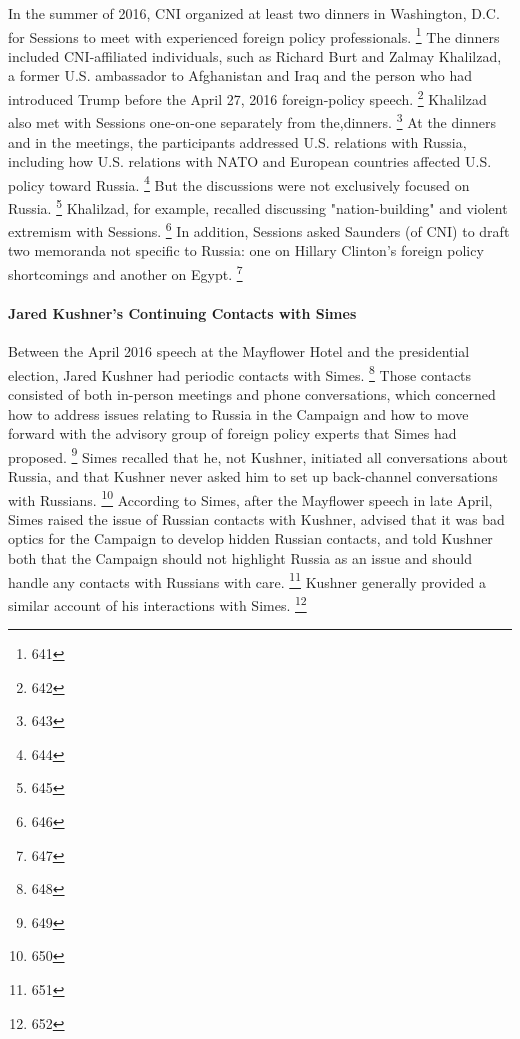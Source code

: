 In the summer of 2016, CNI organized at least two dinners in Washington, D.C. for Sessions to meet with experienced foreign policy professionals.%
\footnote{641}
The dinners included CNI-affiliated individuals, such as Richard Burt and Zalmay Khalilzad, a former U.S. ambassador to Afghanistan and Iraq and the person who had introduced Trump before the April 27, 2016 foreign-policy speech.%
\footnote{642}
Khalilzad also met with Sessions one-on-one separately from the,dinners.%
\footnote{643}
At the dinners and in the meetings, the participants addressed U.S. relations with Russia, including how U.S. relations with NATO and European countries affected U.S. policy toward Russia.%
\footnote{644}
But the discussions were not exclusively focused on Russia.%
\footnote{645}
Khalilzad, for example, recalled discussing "nation-building" and violent extremism with Sessions.%
\footnote{646}
In addition, Sessions asked Saunders (of CNI) to draft two memoranda not specific to Russia: one on Hillary Clinton's foreign policy shortcomings and another on Egypt.%
\footnote{647}

\paragraph{Jared Kushner's Continuing Contacts with Simes}

Between the April 2016 speech at the Mayflower Hotel and the presidential election, Jared Kushner had periodic contacts with Simes.%
\footnote{648}
Those contacts consisted of both in-person meetings and phone conversations, which concerned how to address issues relating to Russia in the Campaign and how to move forward with the advisory group of foreign policy experts that Simes had proposed.%
\footnote{649}
Simes recalled that he, not Kushner, initiated all conversations about Russia, and that Kushner never asked him to set up back-channel conversations with Russians.%
\footnote{650}
According to Simes, after the Mayflower speech in late April, Simes raised the issue of Russian contacts with Kushner, advised that it was bad optics for the Campaign to develop hidden Russian contacts, and told Kushner both that the Campaign should not highlight Russia as an issue and should handle any contacts with Russians with care.%
\footnote{651}
Kushner generally provided a similar account of his interactions with Simes.%
\footnote{652}

